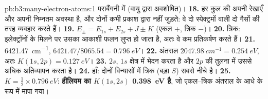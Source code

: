 \begin{solution}{pb:b3:many-electron-atoms:1}
पराबैंगनी में (वायु द्वारा अवशोषित)।
\textbf{18.} हर कुल की अपनी रेखाएँ और अपनी निम्नतम अवस्था है, और
दोनों कभी प्रकाश द्वारा नहीं जुड़ते: वे दो स्पेक्ट्रमों वाली दो गैसों की तरह व्यवहार करते हैं।
\textbf{19.} $E_\pm = E_{1s} + E_{2s} + J \pm K$ (एकल $+$, त्रिक $-$)।
\textbf{20.} त्रिक: इलेक्ट्रॉनों के मिलने पर उसका आकाशी फलन लुप्त हो जाता है,
अतः वे कम प्रतिकर्षण करते हैं।
\textbf{21.} \qty{6421.47}{cm^{-1}}, $6421.47/8065.54 = \qty{0.796}{eV}$।
\textbf{22.} अंतराल $\qty{2047.98}{cm^{-1}} = \qty{0.254}{eV}$, अतः $K(1s,2p) =
\qty{0.127}{eV}$।
\textbf{23.} $2s$, $1s$ क्षेत्र में भेदन करता है और $2p$ की तुलना में उससे
अधिक अतिव्यापन करता है।
\textbf{24.} हाँ: दोनों विन्यासों में त्रिक (बड़ा $S$) सबसे नीचे है।
\textbf{25.} $K = \frac12 \times \qty{0.796}{eV}$: \textbf{हीलियम का  $K(1s,2s)$ \qty{0.398}{eV} है}, जो एकल--त्रिक अंतराल के आधे के रूप में
मापा गया।
\end{solution}
